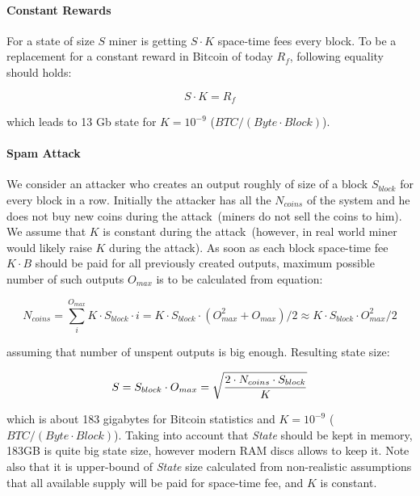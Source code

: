 \documentclass[]{article}   %
\newcommand{\state}{\textit{State}}
\begin{document}
\paragraph{Constant Rewards}

For a state of size $S$ miner is getting $S \cdot K$ space-time fees every block. To be a replacement for a constant reward in Bitcoin of today $R_f$, following equality should holds:

\begin{equation}
\label{eq:statesizeexp}
S \cdot K = R_{f}
\end{equation}

which leads to 13 Gb state for $K=10^{-9}$ ($BTC / (Byte \cdot Block)$).


\paragraph{Spam Attack}

We consider an attacker who creates an output roughly of size of a block $S_{block}$ for every block in a row. Initially the attacker has all the $N_{coins}$ of the system and he does not buy new coins during the attack~(miners do not sell the coins to him). We assume that $K$ is constant during the attack~(however, in real world miner would likely raise $K$ during the attack). As soon as each block space-time fee $K \cdot B$ should be paid for all previously created outputs, maximum possible number of such outputs $O_{max}$ is to be calculated from equation:

\begin{equation}
N_{coins} = \sum_i^{O_{max}}{K \cdot S_{block} \cdot i} = K \cdot S_{block} \cdot ( O_{max}^2 + O_{max}) / 2 \approx K \cdot S_{block} \cdot O_{max}^2 / 2
\end{equation}

assuming that number of unspent outputs is big enough. Resulting state size: 

\begin{equation}
\label{eq:statesizemax}
S = S_{block} \cdot O_{max} = \sqrt { 2 \cdot N_{coins} \cdot S_{block} \over K}
\end{equation}

which is about 183 gigabytes for Bitcoin statistics and $K=10^{-9}$ ($BTC / (Byte \cdot Block)$). Taking into account that \state{} should be kept in memory, 183GB is quite big state size, however modern RAM discs allows to keep it. Note also that it is upper-bound of \state{} size calculated from non-realistic assumptions that all available supply will be paid for space-time fee, and $K$ is constant.
\end{document}
